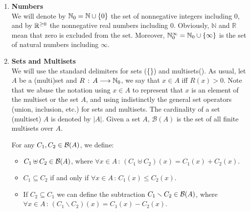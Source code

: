\begin{enumerate}
\item {\bf Numbers}\\
We will denote by $\mathbb{N}_{0} = \mathbb{N} \cup \{0\}$ the set of nonnegative integers including 0,
and by $\mathbb{R}^{\geq 0}$ the nonnegative real numbers including 0. Obviously, $\mathbb{N}$
and $\mathbb{R}$ mean that zero is excluded from the set. Moreover,
$\mathbb{N}_{0}^{\infty} = \mathbb{N}_{0} \cup \left\{\infty \right\}$ is the set of natural numbers including $\infty$. 

\item {\bf Sets and Multisets}\\
We will use the standard delimiters for sets (\{\}) and multisets(\multiset{}). 
As usual, let $A$ be a (multi)set and $R\,:\,A \longrightarrow \mathbb{N}_{0}$, we say 
that $x \in A$ iff $R(x) > 0$.
Note that we abuse the notation using $x \in A$ to represent that $x$ is an element of
the multiset or the set $A$, and using indistinctly the general set operators (union, inclusion, etc.) for sets and multisets. 
The cardinality of a set (multiset) $A$
is denoted by $|A|$. Given a set $A$,
${\mathcal B}(A)$ is the set of all finite multisets over $A$.

For any $C_1, C_2 \in {\cal B}(A)$, we define:
\begin{itemize}
%
%
%
\item $C_1 \uplus C_2 \in {\cal B}(A)$, where $\forall x \in A\,:\,
        (C_1 \uplus C_2)(x)= C_1(x) + C_2(x)$.
\item $C_1 \subseteq C_2$ if and only if $\forall x \in A\,:\,
        C_1(x) \leq C_2(x)$.
\item If $C_2 \subseteq C_1$ we can define the subtraction 
        $C_1 \smallsetminus C_2 \in {\cal B}(A)$, where $\forall x \in A\,:\,
        (C_1 \smallsetminus C_2)(x)= C_1(x) - C_2(x)$.


\end{itemize}
\end{enumerate}
